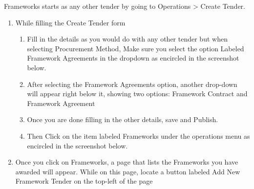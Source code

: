 \documentclass [12pt]{book}
\begin{document}
\begin{enumerate}
\begin{enumerate}
Frameworks starts as any other tender by going to Operations > Create Tender.\\

\begin{enumerate}

    \item	While filling the Create Tender form\\
    
        \begin{enumerate}
            \item	Fill in the details as you would do with any other tender but when selecting Procurement Method, Make sure you select the option Labeled Framework Agreements in the dropdown as encircled in the screenshot below.\\
            \item	After selecting the Framework Agreements option, another drop-down will appear right below it, showing two options: Framework Contract and Framework Agreement
            
            \item	Once you are done filling in the other details, save and Publish.\\
            \item	Then Click on the item labeled Frameworks under the operations menu as encircled in the screenshot below.\\
        \end{enumerate}

    \item Once you click on Frameworks, a page that lists the Frameworks you have awarded will appear. While on this page, locate a button labeled Add New Framework Tender on the top-left of the page


\end{enumerate}
\end{enumerate}
\end{enumerate}
\end{document}

